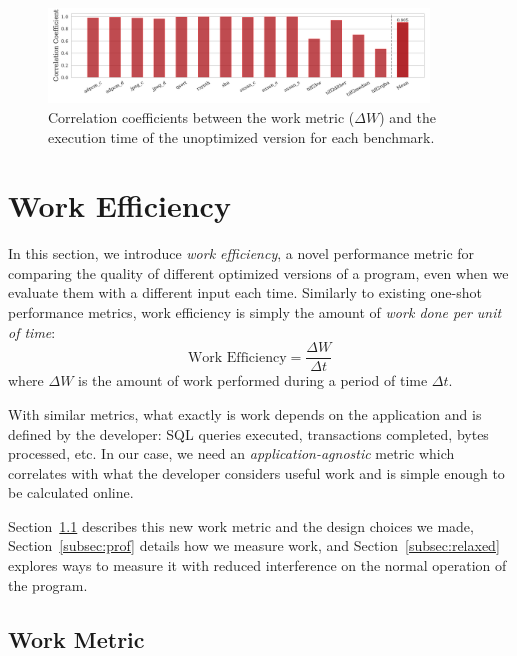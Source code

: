 
\begin{figure}[t]
    \centering
    \includegraphics[width=0.9\textwidth]{figs/corr_coeff.pdf}
    \caption{Correlation coefficients between the work metric ($\Delta W$) and the execution time of the unoptimized version for each benchmark.}
    \label{fig:motivation-speedups}
\end{figure}


\section{Work Efficiency} \label{sec:work}

    In this section, we introduce \textit{work efficiency}, a novel performance metric for comparing the quality of different optimized
    versions of a program, even when we evaluate them with a different input each time. Similarly to existing one-shot performance metrics,
    work efficiency is simply the amount of \textit{work done per unit of time}:
    \[
        \textrm{Work Efficiency} = \frac{\Delta W}{\Delta t}
    \]
    where $\Delta W$ is the amount of work performed during a period of time $\Delta t$.

    With similar metrics, what exactly is work depends on the application and is defined by the developer: SQL queries executed,
    transactions completed, bytes processed, etc. In our case, we need an \emph{application-agnostic} metric which correlates with what
    the developer considers useful work and is simple enough to be calculated online.

    Section~\ref{subsec:workmetric} describes this new work metric and the design choices we made, Section~\ref{subsec:prof} details how
    we measure work, and Section~\ref{subsec:relaxed} explores ways to measure it with reduced interference on %
    the normal operation of the program.

    \subsection{Work Metric} \label{subsec:workmetric}

